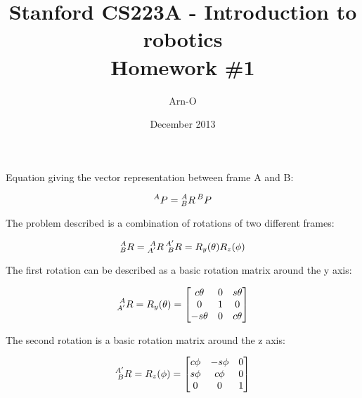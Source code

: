 \documentclass{exam}
\begin{document}
\title{Stanford CS223A - Introduction to robotics \\
  Homework \#1}
\author{Arn-O}
\date{December 2013}
\maketitle

\begin{questions}

\question

Equation giving the vector representation between frame A and B:

\begin{equation}
  \prescript{A}{}{P} = \prescript{A}{B}{R} \prescript{B}{}{P}
\end{equation}

The problem described is a combination of rotations of two different frames:

\begin{equation}
  \prescript{A}{B}{R} = \prescript{A}{A'}{R} \prescript{A'}{B}{R} = R_{y}(\theta) R_{z}(\phi)
\end{equation}

The first rotation can be described as a basic rotation matrix around the y axis:

\begin{equation}
  \prescript{A}{A'}{R} = R_{y}(\theta) = \begin{bmatrix}
                                            c\theta  & 0 & s\theta \\
                                            0        & 1 & 0        \\
                                            -s\theta & 0 & c\theta
                                          \end{bmatrix}
\end{equation}

The second rotation is a basic rotation matrix around the z axis:

\begin{equation}
  \prescript{A'}{B}{R} = R_{z}(\phi) = \begin{bmatrix}
                                          c\phi & -s\phi & 0 \\
                                          s\phi & c\phi  & 0 \\
                                          0     & 0      & 1
                                        \end{bmatrix}
\end{equation}


\end{questions}
\end{document}
